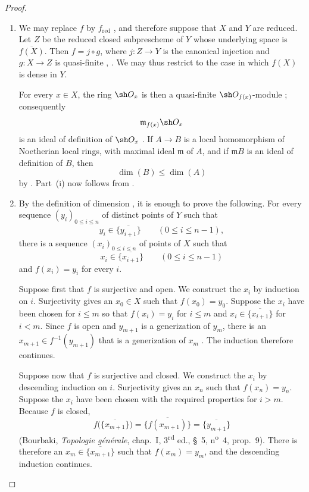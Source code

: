 \begin{proof}
\begin{enumerate}[{\rm(i)}]
\item
We may replace $f$ by $f_{\mathrm{red}}$ , and
therefore suppose that $X$ and $Y$ are reduced.
Let $Z$ be the reduced closed subprescheme of $Y$ whose underlying
space is $\overline{f(X)}$.
Then $f=j\circ g$, where $j:Z\to Y$ is the canonical injection and
$g:X\to Z$ is quasi-finite
, .
We may thus restrict to the case in which $f(X)$ is dense in $Y$.

For every $x\in X$, the ring $\sh O_x$ is then a quasi-finite
$\sh O_{f(x)}$-module ; consequently
\[
\mathfrak m_{f(x)}\sh O_x
\]
is an ideal of definition of $\sh O_x$ .
If $A\to B$ is a local homomorphism of Noetherian local rings, with
maximal ideal $\mathfrak m$ of $A$, and if $\mathfrak mB$ is an ideal
of definition of $B$, then
\[
\dim(B)\leq\dim(A)
\]
by .
Part~(i) now follows from .

\item
By the definition of dimension , it is enough to
prove the following.
For every sequence $(y_i)_{0\leq i\leq n}$ of distinct points of $Y$
such that
\[
y_i\in\overline{\{y_{i+1}\}}
\qquad(0\leq i\leq n-1),
\]
there is a sequence $(x_i)_{0\leq i\leq n}$ of points of $X$ such
that
\[
x_i\in\overline{\{x_{i+1}\}}
\qquad(0\leq i\leq n-1)
\]
and $f(x_i)=y_i$ for every $i$.

Suppose first that $f$ is surjective and open.
We construct the $x_i$ by induction on $i$.
Surjectivity gives an $x_0\in X$ such that $f(x_0)=y_0$.
Suppose the $x_i$ have been chosen for $i\leq m$ so that
$f(x_i)=y_i$ for $i\leq m$ and
$x_i\in\overline{\{x_{i+1}\}}$ for $i<m$.
Since $f$ is open and $y_{m+1}$ is a generization of $y_m$, there is
an $x_{m+1}\in f^{-1}(y_{m+1})$ that is a generization of $x_m$
.
The induction therefore continues.


Suppose now that $f$ is surjective and closed.
We construct the $x_i$ by descending induction on $i$.
Surjectivity gives an $x_n$ such that $f(x_n)=y_n$.
Suppose the $x_i$ have been chosen with the required properties for
$i>m$.
Because $f$ is closed,
\[
f\bigl(\overline{\{x_{m+1}\}}\bigr)
  =\overline{\{f(x_{m+1})\}}
  =\overline{\{y_{m+1}\}}
\]
(Bourbaki, \emph{Topologie g\'en\'erale}, chap.~I,
3\textsuperscript{rd} ed., \S~5, n\textsuperscript{o}~4, prop.~9).
There is therefore an
$x_m\in\overline{\{x_{m+1}\}}$ such that $f(x_m)=y_m$, and the
descending induction continues.
\end{enumerate}
\end{proof}

